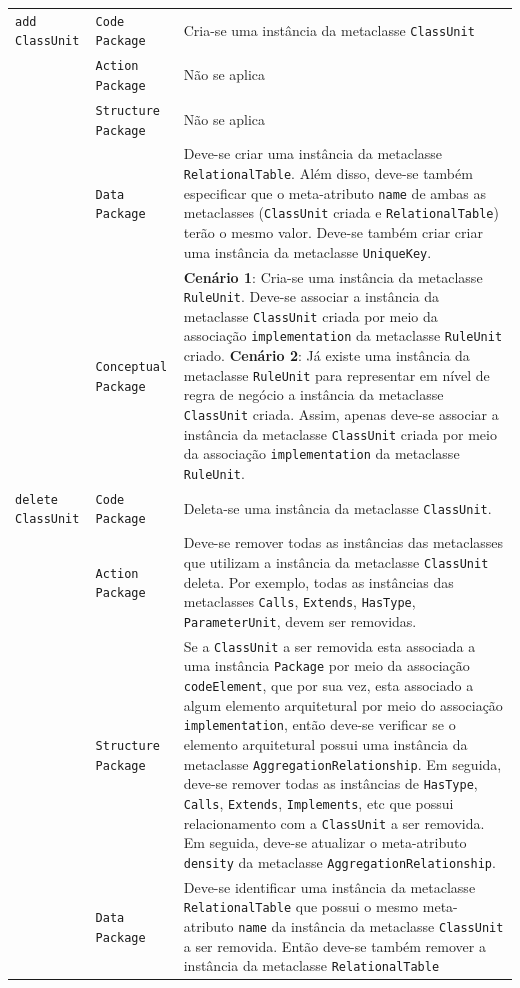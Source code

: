 \begin{longtable}{ | m{1.9cm} | m{3.57cm}| m{9.3cm} | }
 \texttt{add} \texttt{ClassUnit} & \texttt{Code Package} & Cria-se uma instância da metaclasse \texttt{ClassUnit}\tabularnewline
\cline{2-3} 
\cline{2-3} 
 & \texttt{Action Package} & Não se aplica \tabularnewline
 \cline{2-3} 
 & \texttt{Structure Package} & Não se aplica \tabularnewline
\cline{2-3} 
 & \texttt{Data Package} & Deve-se criar uma instância da metaclasse \texttt{RelationalTable}. Além disso, deve-se também especificar que o meta-atributo \texttt{name} de ambas as metaclasses (\texttt{ClassUnit} criada e \texttt{RelationalTable}) terão o mesmo valor. Deve-se também criar criar uma instância da metaclasse \texttt{UniqueKey}. \tabularnewline
\cline{2-3} 
 & \texttt{Conceptual Package} & \textbf{Cenário 1}: Cria-se uma instância da metaclasse \texttt{RuleUnit}. Deve-se associar a instância da metaclasse \texttt{ClassUnit} criada por meio da associação \texttt{implementation} da metaclasse \texttt{RuleUnit} criado. \textbf{Cenário 2}: Já existe uma instância da metaclasse \texttt{RuleUnit} para representar em nível de regra de negócio a instância da metaclasse \texttt{ClassUnit} criada. Assim, apenas deve-se associar a instância da metaclasse \texttt{ClassUnit} criada por meio da associação \texttt{implementation} da metaclasse \texttt{RuleUnit}. \tabularnewline
\hline 
 \texttt{delete} \texttt{ClassUnit} & \texttt{Code Package} & Deleta-se uma instância da metaclasse \texttt{ClassUnit}.\tabularnewline
\cline{2-3} 
& \texttt{Action Package} & Deve-se remover todas as instâncias das metaclasses que utilizam a instância da metaclasse \texttt{ClassUnit} deleta. Por exemplo, todas as instâncias das metaclasses \texttt{Calls}, \texttt{Extends}, \texttt{HasType}, \texttt{ParameterUnit}, devem ser removidas. \tabularnewline
\cline{2-3}
& \texttt{Structure Package} & Se a \texttt{ClassUnit} a ser removida esta associada a uma instância \texttt{Package} por meio da associação \texttt{codeElement}, que por sua vez, esta associado a algum elemento arquitetural por meio do associação \texttt{implementation}, então deve-se verificar se o elemento arquitetural possui uma instância da metaclasse \texttt{AggregationRelationship}. Em seguida, deve-se remover todas as instâncias de \texttt{HasType}, \texttt{Calls}, \texttt{Extends}, \texttt{Implements}, etc que possui relacionamento com a \texttt{ClassUnit} a ser removida. Em seguida, deve-se atualizar o meta-atributo \texttt{density} da metaclasse \texttt{AggregationRelationship}. \tabularnewline
\cline{2-3}
& \texttt{Data Package} & Deve-se identificar uma instância da metaclasse \texttt{RelationalTable} que possui o mesmo meta-atributo \texttt{name} da instância da metaclasse \texttt{ClassUnit} a ser removida. Então deve-se também remover a instância da metaclasse \texttt{RelationalTable} \tabularnewline

\end{longtable}

